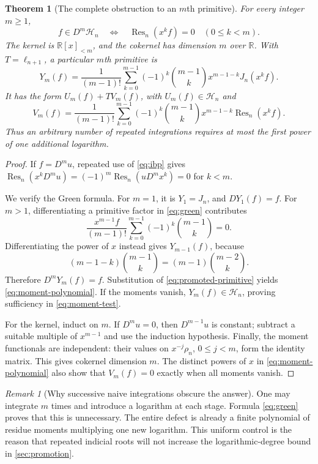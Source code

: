 \documentclass[11pt,a4paper]{article}
\numberwithin{equation}{section}
\newtheorem{theorem}{Theorem}[section]
\theoremstyle{definition}
\theoremstyle{remark}
\newtheorem{remark}[remark]{Remark}
\newcommand{\R}{\mathbb R}
\newcommand{\HH}{\mathcal H}
\newcommand{\Res}{\operatorname{Res}}
\begin{document}
\begin{theorem}[The complete obstruction to an $m$th primitive]
\label{thm:moments}
For every integer $m\ge1$,
\begin{equation}
 f\in D^m\HH_n
 \quad\Longleftrightarrow\quad
 \Res_n(x^k f)=0\quad(0\le k<m).
 \label{eq:moment-test}
\end{equation}
The kernel is $\R[x]_{<m}$, and the cokernel has dimension $m$ over $\R$. With $T=\ell_{n+1}$, a particular $m$th primitive is
\begin{equation}
 Y_m(f)=\frac1{(m-1)!}
 \sum_{k=0}^{m-1}(-1)^k\binom{m-1}{k}
 x^{m-1-k}J_n(x^k f).
 \label{eq:green}
\end{equation}
It has the form $U_m(f)+T V_m(f)$, with $U_m(f)\in\HH_n$ and
\begin{equation}
 V_m(f)=\frac1{(m-1)!}
 \sum_{k=0}^{m-1}(-1)^k\binom{m-1}{k}
 x^{m-1-k}\Res_n(x^k f).
 \label{eq:moment-polynomial}
\end{equation}
Thus an arbitrary number of repeated integrations requires at most the first power of one additional logarithm.
\end{theorem}
\begin{proof}
If $f=D^m u$, repeated use of \eqref{eq:ibp} gives
$\Res_n(x^kD^m u)=(-1)^m\Res_n(uD^m x^k)=0$ for $k<m$.

We verify the Green formula. For $m=1$, it is $Y_1=J_n$, and $DY_1(f)=f$. For $m>1$, differentiating a primitive factor in \eqref{eq:green} contributes
\[
 \frac{x^{m-1}f}{(m-1)!}
 \sum_{k=0}^{m-1}(-1)^k\binom{m-1}{k}=0.
\]
Differentiating the power of $x$ instead gives $Y_{m-1}(f)$, because
\[
 (m-1-k)\binom{m-1}{k}=(m-1)\binom{m-2}{k}.
\]
Therefore $D^mY_m(f)=f$. Substitution of \eqref{eq:promoted-primitive} yields \eqref{eq:moment-polynomial}. If the moments vanish, $Y_m(f)\in\HH_n$, proving sufficiency in \eqref{eq:moment-test}.

For the kernel, induct on $m$. If $D^m u=0$, then $D^{m-1}u$ is constant; subtract a suitable multiple of $x^{m-1}$ and use the induction hypothesis. Finally, the moment functionals are independent: their values on $x^{-j}\rho_n$, $0\le j<m$, form the identity matrix. This gives cokernel dimension $m$. The distinct powers of $x$ in \eqref{eq:moment-polynomial} also show that $V_m(f)=0$ exactly when all moments vanish.
\end{proof}

\begin{remark}[Why successive naive integrations obscure the answer]
One may integrate $m$ times and introduce a logarithm at each stage. Formula \eqref{eq:green} proves that this is unnecessary. The entire defect is already a finite polynomial of residue moments multiplying one new logarithm. This uniform control is the reason that repeated indicial roots will not increase the logarithmic-degree bound in \cref{sec:promotion}.
\end{remark}
\end{document}
